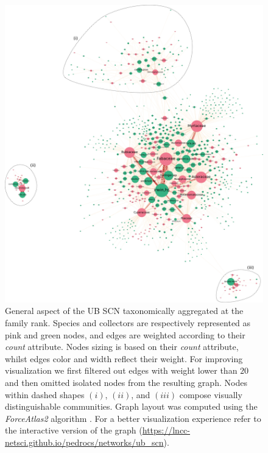 \begin{figure}[!ht]
\centering
\includegraphics[width=\linewidth]{figures/casestudy_ub/scn_agg_family_general.pdf}
\caption[General aspect of the UB SCN taxonomically aggregated at the family rank]{ General aspect of the UB SCN taxonomically aggregated at the family rank. Species and collectors are respectively represented as pink and green nodes, and edges are weighted according to their \textit{count} attribute. Nodes sizing is based on their \textit{count} attribute, whilst edges color and width reflect their weight. For improving visualization we first filtered out edges with weight lower than $20$ and then omitted isolated nodes from the resulting graph. Nodes within dashed shapes $(i)$, $(ii)$, and $(iii)$ compose visually distinguishable communities. Graph layout was computed using the \textit{ForceAtlas2} algorithm \cite{Jacomy2014}. For a better visualization experience refer to the interactive version of the graph (\url{https://lncc-netsci.github.io/pedrocs/networks/ub_scn}). }
\label{fig:ub_scn_agg_family_general}
\end{figure}

